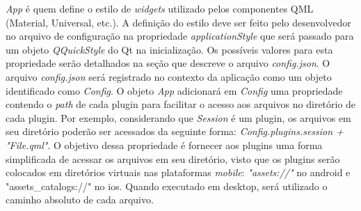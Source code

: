 \textit{App} é quem define o estilo de \textit{widgets} utilizado pelos componentes QML (Material, Universal, etc.). A definição do estilo deve ser feito pelo desenvolvedor no arquivo de configuração na propriedade \textit{applicationStyle} que será passado para um objeto \textit{QQuickStyle} do Qt na inicialização. Os possíveis valores para esta propriedade serão detalhados na seção que descreve o arquivo \textit{config.json}. O arquivo \textit{config.json} será registrado no contexto da aplicação como um objeto identificado como \textit{Config}. O objeto \textit{App} adicionará em \textit{Config} uma propriedade contendo o \textit{path} de cada plugin para facilitar o acesso aos arquivos no diretório de cada plugin. Por exemplo, considerando que \textit{Session} é um plugin, os arquivos em seu diretório poderão ser acessados da seguinte forma: \textit{Config.plugins.session + "File.qml"}. O objetivo dessa propriedade é fornecer aos plugins uma forma simplificada de acessar os arquivos em seu diretório, visto que os plugins serão colocados em diretórios virtuais nas plataformas \textit{mobile}: \textit{"assets://"} no android e "assets\_catalogs://" no ios. Quando executado em desktop, será utilizado o caminho absoluto de cada arquivo.


